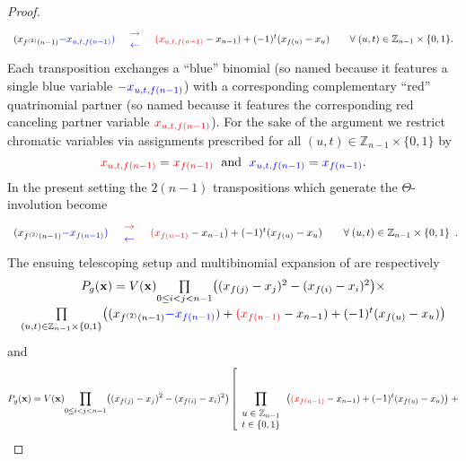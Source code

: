 \begin{proof}
\[
\begin{array}{ccccc}
(x_{f^{(2)}(n-1)}{\color{blue}-x_{u,t,f(n-1)}}{\color{blue})} & \begin{array}{c}
{\color{red}\rightarrow}\\
{\color{blue}\leftarrow}
\end{array} & {\color{red}(x_{u,t,f(n-1)}}-x_{n-1})+(-1)^{t}(x_{f(u)}-x_{u}) &  & \forall\;(u,t)\in\mathbb{Z}_{n-1}\times\{0,1\}.\end{array}
\]
Each transposition exchanges a “blue” binomial (so named because it features a single blue variable ${\color{blue}-x_{u,t,f(n-1)}}$) with a corresponding complementary “red” quatrinomial partner (so named because it features the corresponding red canceling partner variable ${\color{red}x_{u,t,f(n-1)}}$). For the sake of the argument we restrict chromatic variables via assignments prescribed for all $(u,t)\in\mathbb{Z}_{n-1}\times\{0,1\}$ by
\[
{\color{red}x_{u,t,f(n-1)}}={\color{red}x_{f(n-1)}}\;\text{ and }\;{\color{blue}x_{u,t,f(n-1)}}={\color{blue}x_{f(n-1)}}.
\]
In the present setting the $2(n-1)$ transpositions which generate the $\Theta$-involution become
\[
\begin{array}{ccccc}
(x_{f^{(2)}(n-1)}{\color{blue}-x_{f(n-1)}}{\color{blue})} & \begin{array}{c}
{\color{red}\rightarrow}\\
{\color{blue}\leftarrow}
\end{array} & {\color{red}(x_{f(n-1)}}-x_{n-1})+(-1)^{t}(x_{f(u)}-x_{u}) &  & \forall\:(u,t)\in\mathbb{Z}_{n-1}\times\{0,1\}\end{array}.
\]
The ensuing telescoping setup and multibinomial expansion of are respectively
\[
\begin{array}{c}
P_{g}(\mathbf{x})=V(\mathbf{x})\underset{0\le i<j<n-1}{\prod}\big((x_{f(j)}-x_{j})^{2}-(x_{f(i)}-x_{i})^{2}\big)\times\\[10pt]
\underset{(u,t)\in\mathbb{Z}_{n-1}\times\{0,1\}}{\prod}\big((x_{f^{(2)}(n-1)}{\color{blue}-x_{f(n-1)}}{\color{blue})}+{\color{red}(x_{f(n-1)}}-x_{n-1})+(-1)^{t}(x_{f(u)}-x_{u})\big)\\[10pt]
\end{array}
\]
and
\[
P_{g}(\mathbf{x})=V(\mathbf{x})\underset{0\le i<j<n-1}{\prod}\big((x_{f(j)}-x_{j})^{2}-(x_{f(i)}-x_{i})^{2}\big)\left[\prod_{\begin{array}{c}
u\in\mathbb{Z}_{n-1}\\
t\in\{0,1\}
\end{array}}\big({\color{red}(x_{f(n-1)}}-x_{n-1})+(-1)^{t}(x_{f(u)}-x_{u})\big)\right.+
\]
\end{proof}
